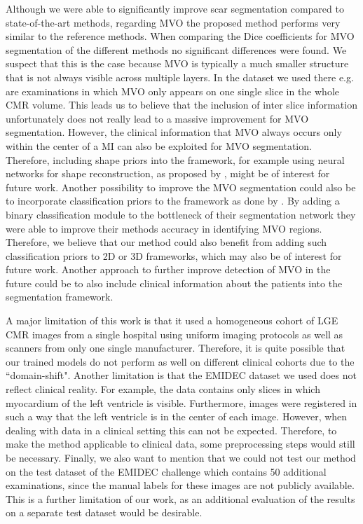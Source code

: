\documentclass[preprint,5p,authoryear]{elsarticle}
\begin{document}
Although we were able to significantly improve scar segmentation compared to state-of-the-art methods, regarding MVO the proposed method performs very similar to the reference methods. When comparing the Dice coefficients for MVO segmentation of the different methods no significant differences were found. We suspect that this is the case because MVO is typically a much smaller structure that is not always visible across multiple layers. In the dataset we used there e.g. are examinations in which MVO only appears on one single slice in the whole CMR volume. This leads us to believe that the inclusion of inter slice information unfortunately does not really lead to a massive improvement for MVO segmentation. However, the clinical information that MVO always occurs only within the center of a MI can also be exploited for MVO segmentation. Therefore, including shape priors into the framework, for example using neural networks for shape reconstruction, as proposed by \cite{yue2019cardiac}, might be of interest for future work. Another possibility to improve the MVO segmentation could also be to incorporate classification priors to the framework as done by \cite{brahim2022improved}. By adding a binary classification module to the bottleneck of their segmentation network they were able to improve their methods accuracy in identifying MVO regions. Therefore, we believe that our method could also benefit from adding such classification priors to 2D or 3D frameworks, which may also be of interest for future work. Another approach to further improve detection of MVO in the future could be to also include clinical information about the patients into the segmentation framework.   

A major limitation of this work is that it used a homogeneous cohort of LGE CMR images from a single hospital using uniform imaging protocols as well as scanners from only one single manufacturer. Therefore, it is quite possible that our trained models do not perform as well on different clinical cohorts due to the ``domain-shift". Another limitation is that the EMIDEC dataset we used does not reflect clinical reality. For example, the data contains only slices in which myocardium of the left ventricle is visible. Furthermore, images were registered in such a way that the left ventricle is in the center of each image. However, when dealing with data in a clinical setting this can not be expected. Therefore, to make the method applicable to clinical data, some preprocessing steps would still be necessary. Finally, we also want to mention that we could not test our method on the test dataset of the EMIDEC challenge which contains 50 additional examinations, since the manual labels for these images are not publicly available. This is a further limitation of our work, as an additional evaluation of the results on a separate test dataset would be desirable.
\end{document}
